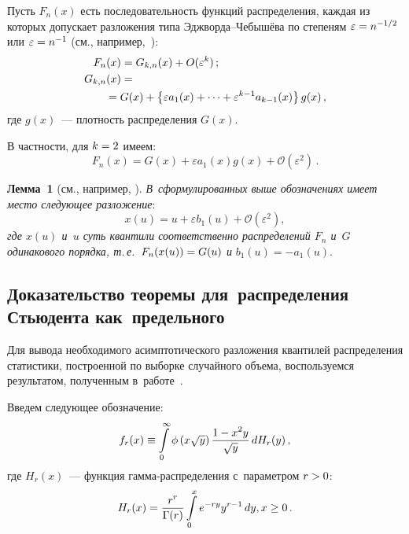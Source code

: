 \begin{multicols}{2}
Пусть $F_{n}(x)$ есть последовательность функций распределения, каждая 
из которых допускает разложения типа Эдж\-вор\-да--Че\-бы\-шё\-ва 
по степеням $\varepsilon\hm=n^{-1/2}$ или $\varepsilon\hm=n^{-1}$ 
(см., например,~\cite{EncStat}):
\begin{align*}
F_n(x)&=G_{k,n}(x)+O(\varepsilon^k)\,; \\
G_{k,n}(x)&={}\\
&\hspace*{-5mm}{}= G(x)+\left\{\varepsilon a_{1}(x)+\cdots+\varepsilon^{k-1}a_{k-1}(x)\right\}
g(x)\,, 
\end{align*}
где $g(x)$~--- плотность распределения $G(x)$.

 В частности, для $k\hm=2$ имеем: 
\begin{equation}
\label{f1}
F_n(x)=G(x)+\varepsilon a_{1}(x)g(x) +\mathcal{O}\left(\varepsilon^{2}\right)\,.
\end{equation}

\noindent
\textbf{Лемма~1} (см., например, \cite{EncStat}).
\textit{В~сформулированных выше обозначениях имеет место следующее разложение}:  
\begin{equation}
\label{e3-u}
 x(u)=u+\varepsilon b_{1}(u) + \mathcal{O}(\varepsilon^{2}),
\end{equation}
\textit{где $x(u)$ и~$u$ суть квантили соответственно распределений $F_{n}$
и~$G$ одинакового порядка, т.\,е.\ $ F_n(x(u))\hm=G(u)$ и}
$b_{1}(u)=-a_{1}(u)$.\\

\subsection{Доказательство теоремы для~распределения Стьюдента как~предельного}

Для вывода необходимого асимптотического разложения квантилей 
распределения статистики, построенной по выборке случайного объема, 
воспользуемся результатом, полученным в~работе~\cite{BenKorGal}.

Введем следующее обозначение:
$$
f_r(x) \equiv \int\limits_{0}^{\infty} \phi\left(x\sqrt{y}\right) \displaystyle\frac{\displaystyle 1-x^{2}y\mathstrut}{\displaystyle \sqrt{y}\mathstrut} \,dH_r(y)\,,
$$
где $H_r(x)$~--- функция гам\-ма-рас\-пре\-де\-ле\-ния с~параметром $r\hm>0$:
$$
H_r(x)=\displaystyle\frac{\displaystyle r^{r}\mathstrut}{\displaystyle \Gamma(r)\mathstrut} \int\limits_{0}^{x} e^{-ry} y^{r-1}\, dy, x \ge 0\,.
$$


\end{multicols}
